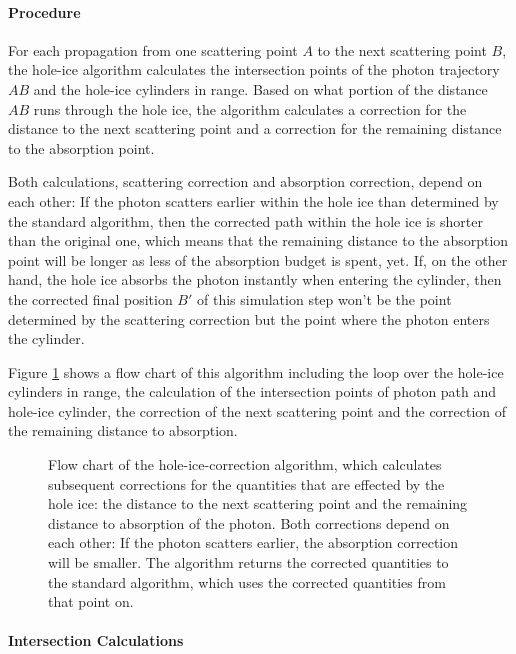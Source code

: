 \paragraph{Procedure}

For each propagation from one scattering point \(A\) to the next
scattering point \(B\), the hole-ice algorithm calculates the
intersection points of the photon trajectory \(AB\) and the hole-ice
cylinders in range. Based on what portion of the distance \(AB\) runs
through the hole ice, the algorithm calculates a correction for the
distance to the next scattering point and a correction for the remaining
distance to the absorption point.

Both calculations, scattering correction and absorption correction,
depend on each other: If the photon scatters earlier within the hole ice
than determined by the standard algorithm, then the corrected path
within the hole ice is shorter than the original one, which means that
the remaining distance to the absorption point will be longer as less of
the absorption budget is spent, yet. If, on the other hand, the hole ice
absorbs the photon instantly when entering the cylinder, then the
corrected final position \(B'\) of this simulation step won't be the
point determined by the scattering correction but the point where the
photon enters the cylinder.

Figure \ref{fig:bahxug7O} shows a flow chart of this algorithm including
the loop over the hole-ice cylinders in range, the calculation of the
intersection points of photon path and hole-ice cylinder, the correction
of the next scattering point and the correction of the remaining
distance to absorption.

\begin{figure}[htbp]
  \caption{Flow chart of the hole-ice-correction algorithm, which calculates subsequent corrections for the quantities that are effected by the hole ice: the distance to the next scattering point and the remaining distance to absorption of the photon. Both corrections depend on each other: If the photon scatters earlier, the absorption correction will be smaller. The algorithm returns the corrected quantities to the standard algorithm, which uses the corrected quantities from that point on.}
  \label{fig:bahxug7O}
\end{figure}

\paragraph{Intersection Calculations}

